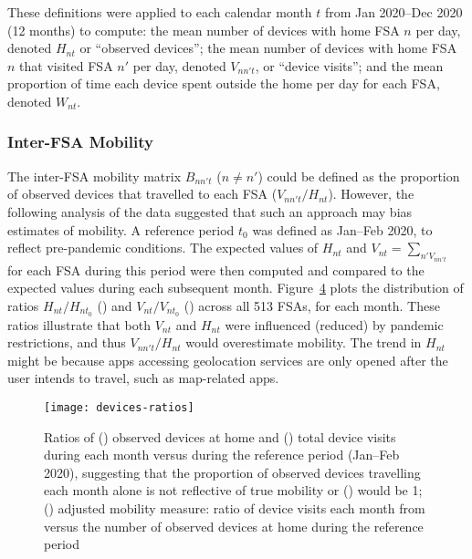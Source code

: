 \par
These definitions were applied to each calendar month $t$ from Jan 2020--Dec 2020 (12 months) to compute:
the mean number of devices with home FSA $n$ per day, denoted $H_{nt}$ or ``observed devices'';
the mean number of devices with home FSA $n$ that visited FSA $n'$ per day, denoted $V_{nn't}$, or ``device visits''; and
the mean proportion of time each device spent outside the home per day for each FSA, denoted $W_{nt}$.
\subsubsection{Inter-FSA Mobility}\label{app.mob.inter}
The inter-FSA mobility matrix $B_{nn't}$ ($n \ne n'$) could be defined as
the proportion of observed devices that travelled to each FSA ($V_{nn't} / H_{nt}$).
However, the following analysis of the data suggested that such an approach may bias estimates of mobility.
A reference period $t_0$ was defined as Jan--Feb 2020, to reflect pre-pandemic conditions.
The expected values of $H_{nt}$ and $V_{nt} = \sum_{n' V_{nn't}}$ for each FSA during this period were then
computed and compared to the expected values during each subsequent month.
Figure~\ref{fig:RHVt} plots the distribution of ratios
$H_{nt} / H_{nt_0}$ () and $V_{nt} / V_{nt_0}$ ()
across all 513 FSAs, for each month.
These ratios illustrate that both $V_{nt}$ and $H_{nt}$ were influenced (reduced) by pandemic restrictions,
and thus $V_{nn't} / H_{nt}$ would overestimate mobility.
The trend in $H_{nt}$ might be because apps accessing geolocation services are only opened
after the user intends to travel, such as map-related apps.
\begin{figure}
  \centering
  \begin{subfigure}{0pt}\label{fig:RHt}\end{subfigure}%
  \begin{subfigure}{0pt}\label{fig:RVt}\end{subfigure}%
  \begin{subfigure}{0pt}\label{fig:RH0Vt}\end{subfigure}%
  \texttt{[image: devices-ratios]}
  \caption{Ratios of () observed devices at home
    and () total device visits
    during each month versus during the reference period (Jan--Feb 2020),
    suggesting that the proportion of observed devices travelling each month
    alone is not reflective of true mobility or () would be 1;
    () adjusted mobility measure: ratio of
    device visits each month from versus
    the number of observed devices at home during the reference period}
  \label{fig:RHVt}
\end{figure}

